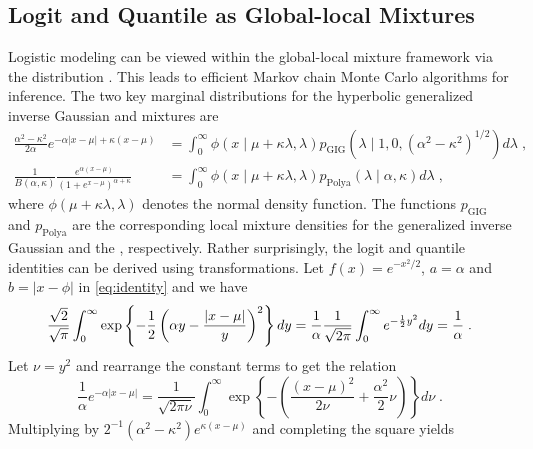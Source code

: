 \documentclass[lineno]{biometrika}
\begin{document}
\subsection{Logit and Quantile as Global-local Mixtures}
Logistic modeling can be viewed within the global-local mixture framework via
the \PG{} distribution \citep{polson_bayesian_2013}. This leads to efficient
Markov chain Monte Carlo algorithms for inference.  The two key marginal
distributions for the hyperbolic generalized inverse Gaussian 
\citep{barndorff1982normal} and \PG{} mixtures are
\begin{align}
  \frac{\alpha^2 - \kappa^2}{2\alpha} e^{-\alpha|x-\mu| + \kappa (x-\mu)} 
  &= \int_0^{\infty} \phi(x \mid \mu + \kappa \lambda, \lambda) 
  p_{\mathrm{GIG}}\left(\lambda \mid 1,0, (\alpha^2 - \kappa^2)^{1/2}\right) d\lambda
  \;, 
  \label{eq:GIG}
  \\
  \frac{1}{B(\alpha,\kappa)} \frac{e^{\alpha (x-\mu)}}{(1+e^{x-\mu})^{\alpha + \kappa}} 
  &= \int_0^{\infty} \phi(x \mid \mu + \kappa \lambda, \lambda) 
  p_{\mathrm{Polya}}(\lambda \mid \alpha,\kappa)  d\lambda
  \;, 
  \label{eq:polya}
\end{align}
where $\phi(\mu + \kappa \lambda, \lambda)$ denotes the normal density
function.  The functions $p_{\mathrm{GIG}}$ and $p_{\mathrm{Polya}}$ are
the corresponding local mixture densities for the generalized inverse Gaussian and
the \PG{}, respectively.  Rather surprisingly, the logit and quantile
identities can be derived using \CS{} transformations.  
Let $f(x) = e^{-x^2/2}$, $a = \alpha$ and $b = |x-\phi|$ in \eqref{eq:identity}
and we have 
$$
\frac{\sqrt{2}}{\sqrt{\pi}} \int_{0}^{\infty} 
\exp\left\{-\frac{1}{2} \left(\alpha y - \frac{|x-\mu|}{y} \right)^2 \right\} dy 
= \frac{1}{\alpha} \frac{1}{\sqrt{2\pi}} \int_0^{\infty} e^{-\frac{1}{2} y^2} dy 
= \frac{1}{\alpha}
\;.
$$
Let $\nu = y^2$ and rearrange the constant terms to get the relation
$$
\frac{1}{\alpha} e^{-\alpha|x-\mu|} = 
\frac{1}{\sqrt{2 \pi \nu}} \int_{0}^{\infty} 
\exp\left\{-\left( \frac{(x-\mu)^2}{2\nu} + \frac{\alpha^2}{2} \nu \right)\right\} 
d\nu
\;.
$$
Multiplying by $2^{-1}(\alpha^2-\kappa^2) e^{\kappa(x-\mu)}$ and
completing the square yields
\end{document}
